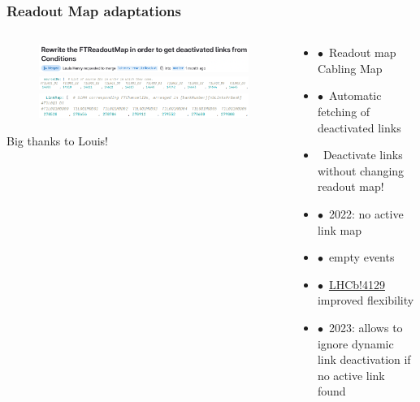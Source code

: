 \documentclass[aspectratio=1610, 12pt, xcolor=dvipsnames]{beamer}
\begin{document}
\begin{frame}\frametitle{Readout Map adaptations}
  \begin{columns}
    \begin{column}[c]{0.52\textwidth}
      \begin{figure}
        \includegraphics[width=\textwidth]{plots/merged_4096.png} \\
        \vspace{0.6cm}
        \includegraphics[width=\textwidth]{plots/old_readout.png} \\
        \vspace{0.6cm}
        \includegraphics[width=\textwidth]{plots/new_readout.png} \\
      \end{figure}
      Big thanks to Louis!
    \end{column}
    \begin{column}[c]{0.48\textwidth}
      \begin{itemize}
        \item $\bullet$\, Readout map \to\, Cabling Map
        \item $\bullet$\, Automatic fetching of deactivated links
        \item \to\, Deactivate links without changing readout map!
        \item $\bullet$\, 2022: no active link map 
        \item $\bullet$\, \to empty events
        \item $\bullet$\, \href{https://gitlab.cern.ch/lhcb/LHCb/-/merge_requests/4129}{LHCb!4129} improved flexibility
        \item $\bullet$\, 2023: allows to ignore dynamic link deactivation if no active link found
      \end{itemize}
    \end{column}
  \end{columns}
\end{frame}
\end{document}
